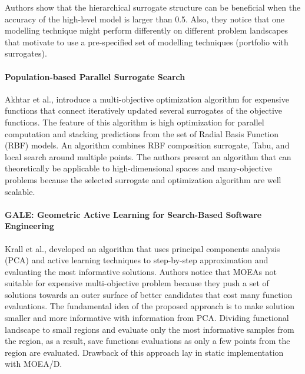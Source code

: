         Authors show that the hierarchical surrogate structure can be beneficial when the accuracy of the high-level model is larger than 0.5. Also, they notice that one modelling technique might perform differently on different problem landscapes that motivate to use a pre-specified set of modelling techniques (portfolio with surrogates).
        
        \paragraph{Population-based Parallel Surrogate Search} Akhtar et al.,\cite{akhtar2019efficient} introduce a multi-objective optimization algorithm for expensive functions that connect iteratively updated several surrogates of the objective functions. The feature of this algorithm is high optimization for parallel computation and stacking predictions from the set of Radial Basis Function (RBF) models. An algorithm combines RBF composition surrogate, Tabu, and local search around multiple points. The authors present an algorithm that can theoretically be applicable to high-dimensional spaces and many-objective problems because the selected surrogate and optimization algorithm are well scalable.


        \paragraph{GALE: Geometric Active Learning for Search-Based Software Engineering} Krall et al.,\cite{KrallMD15} developed an algorithm that uses principal components analysis (PCA) and active learning techniques to step-by-step approximation and evaluating the most informative solutions. Authors notice that MOEAs not suitable for expensive multi-objective problem because they push a set of solutions towards an outer surface of better candidates that cost many function evaluations. The fundamental idea of the proposed approach is to make solution smaller and more informative with information from PCA. Dividing functional landscape to small regions and evaluate only the most informative samples from the region, as a result, save functions evaluations as only a few points from the region are evaluated. Drawback of this approach lay in static implementation with MOEA/D.     


